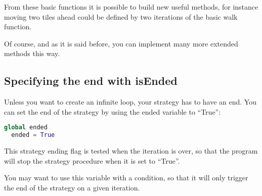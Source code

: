 \documentclass[a4paper,11pt]{article}
\begin{document}
From these basic functions it is possible to build new useful methods, for instance moving two 
tiles ahead could be defined by two iterations of the basic walk function. 

Of course, and as it is said before, you can implement many more extended methods this way.

\subsection{Specifying the end with isEnded}
Unless you want to create an infinite loop, your strategy has to have an end. You can set the end of the strategy 
by using the ended variable to ``True'':

\begin{lstlisting}[language=Python]
  global ended
  ended = True
\end{lstlisting}

This strategy ending flag is tested when the iteration is over, so that the program will 
stop the strategy procedure when it is set to ``True''.

You may want to use this variable with a condition, so that it will only trigger the end of the strategy
on a given iteration.
\end{document}
